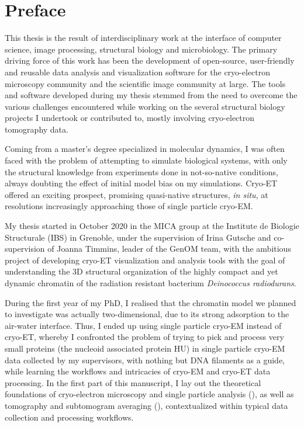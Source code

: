 \chapter{Preface}

This thesis is the result of interdisciplinary work at the interface of computer science, image processing, structural biology and microbiology.
The primary driving force of this work has been the development of open-source, user-friendly and reusable data analysis and visualization software for the cryo-electron microscopy community and the scientific image community at large.
The tools and software developed during my thesis stemmed from the need to overcome the various challenges encountered while working on the several structural biology projects I undertook or contributed to, mostly involving cryo-electron tomography data.

Coming from a master's degree specialized in molecular dynamics, I was often faced with the problem of attempting to simulate biological systems, with only the structural knowledge from experiments done in not-so-native conditions, always doubting the effect of initial model bias on my simulations.
Cryo-ET offered an exciting prospect, promising quasi-native structures, \textit{in situ}, at resolutions increasingly approaching those of single particle cryo-EM.

My thesis started in October 2020 in the MICA group at the Institute de Biologie Structurale (IBS) in Grenoble, under the supervision of Irina Gutsche and co-supervision of Joanna Timmins, leader of the GenOM team, with the ambitious project of developing cryo-ET visualization and analysis tools with the goal of understanding the 3D structural organization of the highly compact and yet dynamic chromatin of the radiation resistant bacterium \textit{Deinococcus radiodurans}.

During the first year of my PhD, I realised that the chromatin model we planned to investigate was actually two-dimensional, due to its strong adsorption to the air-water interface.
Thus, I ended up using single particle cryo-EM instead of cryo-ET, whereby I confronted the problem of trying to pick and process very small proteins (the nucleoid associated protein HU) in single particle cryo-EM data collected by my supervisors, with nothing but DNA filaments as a guide, while learning the workflows and intricacies of cryo-EM and cryo-ET data processing.
In the first part of this manuscript, I lay out the theoretical foundations of cryo-electron microscopy and single particle analysis (), as well as tomography and subtomogram averaging (), contextualized within typical data collection and processing workflows.

